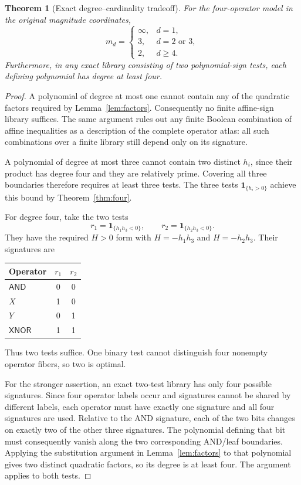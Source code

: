 \documentclass[11pt]{article}
\newtheorem{theorem}{Theorem}[section]
\theoremstyle{definition}
\theoremstyle{remark}
\newcommand{\AND}{\mathsf{AND}}
\newcommand{\XNOR}{\mathsf{XNOR}}
\begin{document}
\begin{theorem}[Exact degree--cardinality tradeoff]\label{thm:degree}
For the four-operator model in the original magnitude coordinates,
\begin{equation}\label{eq:tradeoff}
 m_d=\begin{cases}
 \infty,&d=1,\\
 3,&d=2\text{ or }3,\\
 2,&d\ge4.
 \end{cases}
\end{equation}
Furthermore, in any exact library consisting of two polynomial-sign tests, \emph{each} defining polynomial has degree at least four.
\end{theorem}
\begin{proof}
A polynomial of degree at most one cannot contain any of the quadratic factors required by Lemma~\ref{lem:factors}. Consequently no finite affine-sign library suffices. The same argument rules out any finite Boolean combination of affine inequalities as a description of the complete operator atlas: all such combinations over a finite library still depend only on its signature.

A polynomial of degree at most three cannot contain two distinct $h_i$, since their product has degree four and they are relatively prime. Covering all three boundaries therefore requires at least three tests. The three tests $\boldsymbol1_{\{h_i>0\}}$ achieve this bound by Theorem~\ref{thm:four}.

For degree four, take the two tests
\begin{equation}\label{eq:quartic}
 r_1=\boldsymbol1_{\{h_1h_3<0\}},\qquad
 r_2=\boldsymbol1_{\{h_2h_3<0\}}.
\end{equation}
They have the required $H>0$ form with $H=-h_1h_3$ and $H=-h_2h_3$. Their signatures are
\begin{center}
\begin{tabular}{@{}lcc@{}}
\toprule
Operator & $r_1$ & $r_2$\\
\midrule
$\AND$ & 0 & 0\\
$X$ & 1 & 0\\
$Y$ & 0 & 1\\
$\XNOR$ & 1 & 1\\
\bottomrule
\end{tabular}
\end{center}
Thus two tests suffice. One binary test cannot distinguish four nonempty operator fibers, so two is optimal.

For the stronger assertion, an exact two-test library has only four possible signatures. Since four operator labels occur and signatures cannot be shared by different labels, each operator must have exactly one signature and all four signatures are used. Relative to the AND signature, each of the two bits changes on exactly two of the other three signatures. The polynomial defining that bit must consequently vanish along the two corresponding AND/leaf boundaries. Applying the substitution argument in Lemma~\ref{lem:factors} to that polynomial gives two distinct quadratic factors, so its degree is at least four. The argument applies to both tests.
\end{proof}
\end{document}
